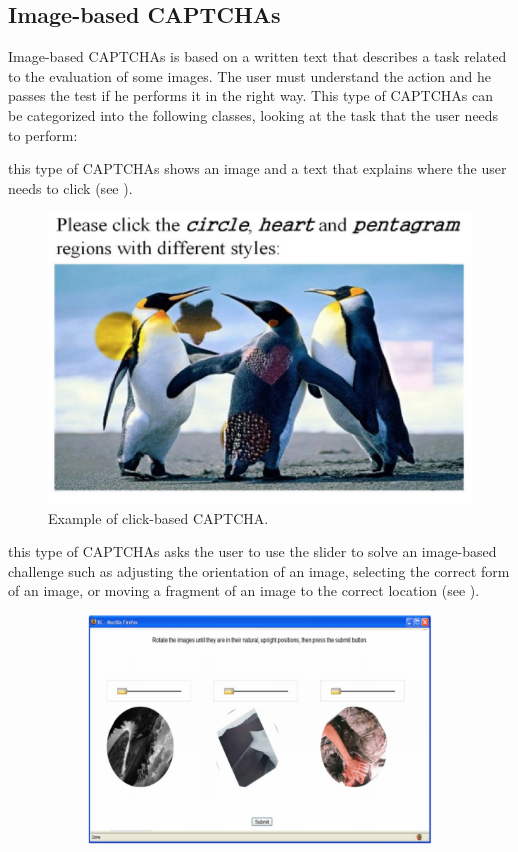 \subsection{Image-based CAPTCHAs}
Image-based CAPTCHAs is based on a written text that describes a task related to the evaluation of some images. The user must understand the action and he passes the test if he performs it in the right way. This type of CAPTCHAs can be categorized into the following classes, looking at the task that the user needs to perform:
\begin{itemize}
{this type of CAPTCHAs shows an image and a text that explains where the user needs to click (see ).
\begin{figure}[h]
     \centering
     \includegraphics[width=.45\linewidth]{Images/StateOfArt/click_CAPTCHA}
     \caption{\footnotesize{Example of click-based CAPTCHA.}}\label{soa:click_CAPTCHA}
\end{figure}
}
{this type of CAPTCHAs asks the user to use the slider to solve an image-based challenge such as adjusting the orientation of an image, selecting the correct form of an image, or moving a fragment of an image to the correct location (see ).
\begin{figure}[h]
     \centering
     \begin{subfigure}[b]{0.48\textwidth}
         \centering
         \includegraphics[width=.9\linewidth]{Images/StateOfArt/sliding_image_CAPTCHA}

\end{subfigure}
\end{figure}}
\end{itemize}
